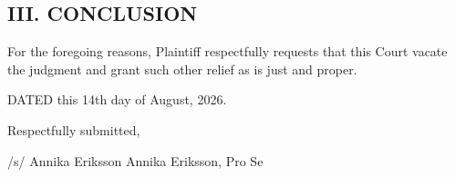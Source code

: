 \documentclass[12pt]{article}
\begin{document}
\subsection*{III. CONCLUSION}
\par\vspace{0.5em}
For the foregoing reasons, Plaintiff respectfully requests that this Court vacate the judgment and grant such other relief as is just and proper.
\par\vspace{0.5em}
DATED this 14th day of August, 2026.
\par\vspace{0.5em}
Respectfully submitted,
\par\vspace{0.5em}
/s/ Annika Eriksson
Annika Eriksson, Pro Se
\end{document}
